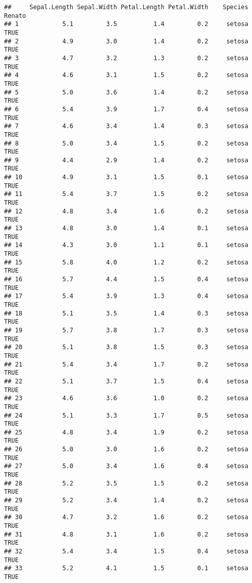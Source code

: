 \documentclass[]{article}
\begin{document}
\begin{verbatim}
##     Sepal.Length Sepal.Width Petal.Length Petal.Width    Species Renato
## 1            5.1         3.5          1.4         0.2     setosa   TRUE
## 2            4.9         3.0          1.4         0.2     setosa   TRUE
## 3            4.7         3.2          1.3         0.2     setosa   TRUE
## 4            4.6         3.1          1.5         0.2     setosa   TRUE
## 5            5.0         3.6          1.4         0.2     setosa   TRUE
## 6            5.4         3.9          1.7         0.4     setosa   TRUE
## 7            4.6         3.4          1.4         0.3     setosa   TRUE
## 8            5.0         3.4          1.5         0.2     setosa   TRUE
## 9            4.4         2.9          1.4         0.2     setosa   TRUE
## 10           4.9         3.1          1.5         0.1     setosa   TRUE
## 11           5.4         3.7          1.5         0.2     setosa   TRUE
## 12           4.8         3.4          1.6         0.2     setosa   TRUE
## 13           4.8         3.0          1.4         0.1     setosa   TRUE
## 14           4.3         3.0          1.1         0.1     setosa   TRUE
## 15           5.8         4.0          1.2         0.2     setosa   TRUE
## 16           5.7         4.4          1.5         0.4     setosa   TRUE
## 17           5.4         3.9          1.3         0.4     setosa   TRUE
## 18           5.1         3.5          1.4         0.3     setosa   TRUE
## 19           5.7         3.8          1.7         0.3     setosa   TRUE
## 20           5.1         3.8          1.5         0.3     setosa   TRUE
## 21           5.4         3.4          1.7         0.2     setosa   TRUE
## 22           5.1         3.7          1.5         0.4     setosa   TRUE
## 23           4.6         3.6          1.0         0.2     setosa   TRUE
## 24           5.1         3.3          1.7         0.5     setosa   TRUE
## 25           4.8         3.4          1.9         0.2     setosa   TRUE
## 26           5.0         3.0          1.6         0.2     setosa   TRUE
## 27           5.0         3.4          1.6         0.4     setosa   TRUE
## 28           5.2         3.5          1.5         0.2     setosa   TRUE
## 29           5.2         3.4          1.4         0.2     setosa   TRUE
## 30           4.7         3.2          1.6         0.2     setosa   TRUE
## 31           4.8         3.1          1.6         0.2     setosa   TRUE
## 32           5.4         3.4          1.5         0.4     setosa   TRUE
## 33           5.2         4.1          1.5         0.1     setosa   TRUE

\end{verbatim}
\end{document}

